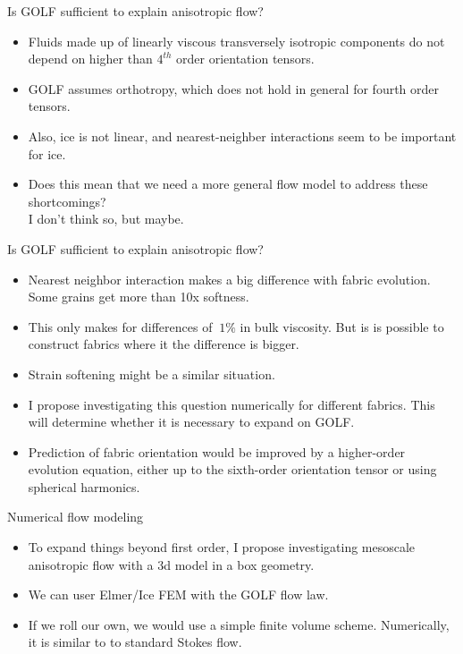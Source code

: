 \documentclass{beamer}
\begin{document}
\begin{frame}{Is GOLF sufficient to explain anisotropic flow?}
   \begin{itemize}
      \item Fluids made up of linearly viscous transversely isotropic components do not depend on higher than $4^{th}$ order orientation tensors.
      \item GOLF assumes orthotropy, which does not hold in general for fourth order tensors.
      \item Also, ice is not linear, and nearest-neighber interactions seem to be important for ice.
      \item Does this mean that we need a more general flow model to address these shortcomings? \\
         \pause I don't think so, but maybe.
   \end{itemize}
\end{frame}
\begin{frame}{Is GOLF sufficient to explain anisotropic flow?}
   \begin{itemize}
      \item Nearest neighbor interaction makes a big difference with fabric evolution. Some grains get more than 10x softness.
      \item This only makes for differences of $~1\%$ in bulk viscosity. But is is possible to construct fabrics where it the difference is bigger.
      \item Strain softening might be a similar situation.
      \item I propose investigating this question numerically for different fabrics. This will determine whether it is necessary to expand on GOLF.
      \item Prediction of fabric orientation would be improved by a higher-order evolution equation, either up to the sixth-order orientation tensor or using spherical harmonics.
   \end{itemize}
\end{frame}
\begin{frame}{Numerical flow modeling}
   \begin{itemize}
      \item To expand things beyond first order, I propose investigating mesoscale anisotropic flow with a 3d model in a box geometry.
      \item We can user Elmer/Ice FEM with the GOLF flow law.
      \item If we roll our own, we would use a simple finite volume scheme. Numerically, it is similar to to standard Stokes flow.
   \end{itemize}
\end{frame}
\end{document}
